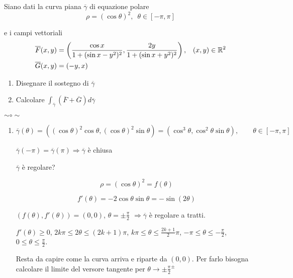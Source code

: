 \begin{exbar}
\begin{example}
	Siano dati la curva piana $\overline{\gamma}$ di equazione polare
	\begin{equation*}
		\rho = (\cos \theta)^2,\,\,\, \theta \in[-\pi,\pi] 
	\end{equation*}
	
	e i campi vettoriali
	\begin{align*}
		\overline{F}(x,y)&=\left( \frac{\cos x}{1+(\sin x-y^2)^2},\frac{2y}{1+(\sin x + y^2)^2} \right),\,\,\,\,\,(x,y) \in \mathbb{R}^2 \\
		\overline{G}(x,y)&= (-y,x)
	\end{align*}
	\begin{enumerate}
		\item Disegnare il sostegno di $\overline{\gamma}$
		\item Calcolare $\int_{\overline{\gamma}}(\overline{F}+\overline{G})d\overline{\gamma}$
	\end{enumerate}
	
	{\centering $\sim \circ \sim$ \par}
	
	\begin{enumerate}
		\item $$\overline{\gamma}(\theta)=((\cos \theta)^2\cos \theta, (\cos \theta)^2 \sin \theta)=(\cos^3 \theta, \cos ^2 \theta \sin \theta), \qquad \theta \in [-\pi,\pi]$$
		
		$\overline{\gamma}(-\pi)=\overline{\gamma}(\pi)\Rightarrow \overline{\gamma}$ è chiusa
		
		$\overline{\gamma}$ è regolare?
		
		$$\rho=(\cos \theta )^2=f(\theta)$$
		
		$$f'(\theta)=-2\cos \theta \sin \theta=-\sin(2\theta)$$
		
		$(f(\theta), f'(\theta))=(0,0)$, $\theta = \pm\frac{\pi}{2}$ $\Rightarrow \overline{\gamma} $ è regolare a tratti.
		
		$f'(\theta) \geq 0$, $2k\pi \leq 2\theta \leq (2k+1)\pi$, $k\pi \leq \theta \leq \frac{2k+1}{2}\pi$, $-\pi \leq \theta \leq -\frac{\pi}{2}$, $0 \leq \theta \leq \frac{\pi}{2}$.

		\segnaposto %

		Resta da capire come la curva arriva e riparte da $(0,0)$. Per farlo bisogna calcolare il limite del versore tangente per $\theta \rightarrow \pm \frac{\pi}{2}^{\pm}$
		
		

\end{enumerate}
\end{example}
\end{exbar}
